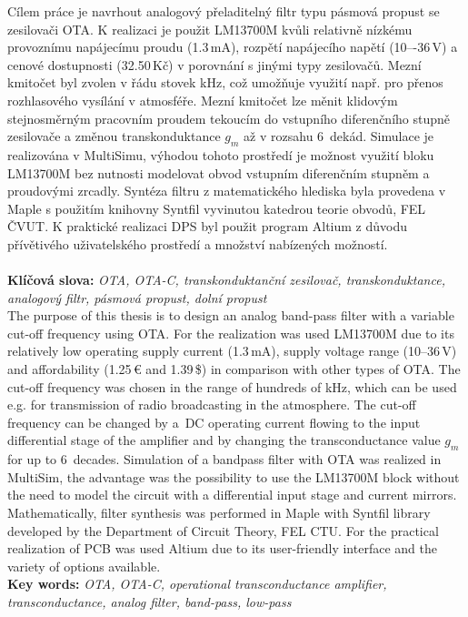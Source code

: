 \noindent Cílem práce je navrhout analogový přeladitelný filtr typu pásmová propust se zesilovači OTA. K realizaci je použit LM13700M kvůli relativně nízkému provoznímu napájecímu proudu (1.3\,mA), rozpětí napájecího napětí (10–-36\,V) a cenové dostupnosti (32.50\,Kč) v porovnání s jinými typy zesilovačů. Mezní kmitočet byl zvolen v řádu stovek kHz, což umožňuje využití např. pro přenos rozhlasového vysílání v atmosféře. Mezní kmitočet lze měnit klidovým stejnosměrným pracovním proudem tekoucím do vstupního diferenčního stupně zesilovače a změnou transkonduktance $g_m$ až v rozsahu 6~dekád. Simulace je realizována v MultiSimu, výhodou tohoto prostředí je možnost využití bloku LM13700M bez nutnosti modelovat obvod vstupním diferenčním stupněm a proudovými zrcadly. Syntéza filtru z matematického hlediska byla provedena v Maple s použitím knihovny Syntfil vyvinutou katedrou teorie obvodů, FEL ČVUT. K praktické realizaci DPS byl použit program Altium z důvodu přívětivého uživatelského prostředí a množství nabízených možností. \\
\\
\noindent \textbf{Klíčová slova:} \textit{OTA, OTA-C, transkonduktanční zesilovač, transkonduktance, analogový filtr, pásmová propust, dolní propust}\\

\noindent The purpose of this thesis is to design an analog band-pass filter with a variable cut-off frequency using OTA. For the realization was used LM13700M due to its relatively low operating supply current (1.3\,mA), supply voltage range (10--36\,V) and affordability (1.25\,\euro{} and 1.39\,\$) in comparison with other types of OTA. The cut-off frequency was chosen in the range of hundreds of kHz, which can be used e.g. for transmission of radio broadcasting in the atmosphere. The cut-off frequency can be changed by a~DC operating current flowing to the input differential stage of the amplifier and by changing the transconductance value $g_m$ for up to 6~decades. Simulation of a bandpass filter with OTA was realized in MultiSim, the advantage was the possibility to use the LM13700M block without the need to model the circuit with a differential input stage and current mirrors. Mathematically, filter synthesis was performed in Maple with Syntfil library developed by the Department of Circuit Theory, FEL CTU. For the practical realization of PCB was used Altium due to its user-friendly interface and the variety of options available. \\

\noindent \textbf{Key words:} \textit{OTA, OTA-C, operational transconductance amplifier, transconductance, analog filter, band-pass, low-pass} \\